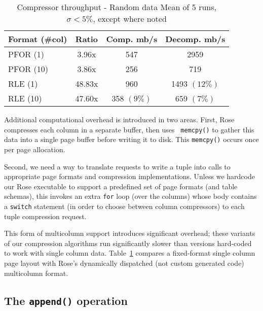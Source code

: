 \documentclass{vldb}
\newcommand{\rows}{Rose\xspace}
\newcommand{\rowss}{Rose's\xspace}
\begin{document}
\begin{table}
\caption{Compressor throughput - Random data Mean of 5 runs, $\sigma<5\%$, except where noted}
\centering
\label{table:perf}
\begin{tabular}{|l|c|c|c|} \hline
Format (\#col)    & Ratio & Comp. mb/s & Decomp. mb/s\\ \hline %
PFOR (1)      &    3.96x  &  547  &    2959 \\ \hline %
PFOR (10)     &    3.86x  &  256 &      719 \\ \hline %
RLE (1)       &   48.83x  &  960  &    1493 $(12\%)$ \\ \hline %
RLE (10)      &   47.60x  &  358 $(9\%)$ & 659 $(7\%)$ \\  %
\hline\end{tabular}
\end{table}


Additional computational overhead is introduced in two areas.  First,
\rows compresses each column in a separate buffer, then uses {\tt
  memcpy()} to gather this data into a single page buffer before
writing it to disk.  This {\tt memcpy()} occurs once per page
allocation.

Second, we need a way to translate requests to write a tuple into
calls to appropriate page formats and compression implementations.
Unless we hardcode our \rows executable to support a predefined set of
page formats (and table schemas), this invokes an extra {\tt for} loop
(over the columns) whose body contains a {\tt switch} statement (in
order to choose between column compressors) to each tuple compression
request.

This form of multicolumn support introduces significant overhead;
these variants of our compression algorithms run significantly slower
than versions hard-coded to work with single column data.
Table~\ref{table:perf} compares a fixed-format single column page
layout with \rowss dynamically dispatched (not custom generated code)
multicolumn format.


\subsection{The {\tt \large append()} operation}
\end{document}
